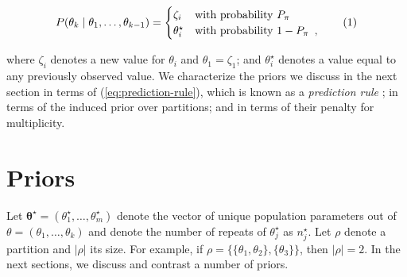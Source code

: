 \documentclass[11pt,a4paper]{article}
\theoremstyle{definition} %
\theoremstyle{case}
\newcommand{\numberthis}{\addtocounter{equation}{1}\tag{\theequation}}
\newcommand{\FD}[1]{\todo[inline, color=pink]{ \textbf{FD}: #1 }}
\begin{document}
\begin{equation} \label{eq:prediction-rule}
    P(\theta_k \mid \theta_1, \ldots, \theta_{k - 1}) = \begin{cases}
    \zeta_i & \text{with probability } P_{\pi} \\
    \theta_i^{\star} & \text{with probability }  1- P_{\pi} \enspace ,
    \end{cases} \numberthis
\end{equation}

where $\zeta_i$ denotes a new value for $\theta_i$ and $\theta_1 = \zeta_1$; and $\theta_i^{\star}$ denotes a value equal to any previously observed value. We characterize the priors we discuss in the next section in terms of (\ref{eq:prediction-rule}), which is known as a \textit{prediction rule} \parencite[e.g.,][]{ishwaran2001gibbs}; in terms of the induced prior over partitions; and in terms of their penalty for multiplicity.





\section{Priors} \label{sec:priors}
Let $\mathbf{\theta^{\star}} = (\theta^{\star}_1, \ldots, \theta^{\star}_m)$ denote the vector of unique population parameters out of $\theta = (\theta_1, \ldots, \theta_k)$ and denote the number of repeats of $\theta^{\star}_j$ as $n^{\star}_j$. Let $\rho$ denote a partition and $|\rho|$ its size. For example, if $\rho = \{\{\theta_1, \theta_2\}, \{\theta_3\}\}$, then $|\rho| = 2$. In the next sections, we discuss and contrast a number of priors.
\end{document}
